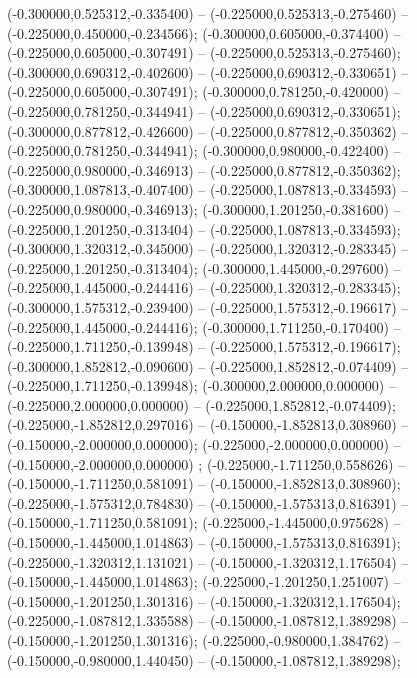  (-0.300000,0.525312,-0.335400) -- (-0.225000,0.525313,-0.275460) -- (-0.225000,0.450000,-0.234566);
 (-0.300000,0.605000,-0.374400) -- (-0.225000,0.605000,-0.307491) -- (-0.225000,0.525313,-0.275460);
 (-0.300000,0.690312,-0.402600) -- (-0.225000,0.690312,-0.330651) -- (-0.225000,0.605000,-0.307491);
 (-0.300000,0.781250,-0.420000) -- (-0.225000,0.781250,-0.344941) -- (-0.225000,0.690312,-0.330651);
 (-0.300000,0.877812,-0.426600) -- (-0.225000,0.877812,-0.350362) -- (-0.225000,0.781250,-0.344941);
 (-0.300000,0.980000,-0.422400) -- (-0.225000,0.980000,-0.346913) -- (-0.225000,0.877812,-0.350362);
 (-0.300000,1.087813,-0.407400) -- (-0.225000,1.087813,-0.334593) -- (-0.225000,0.980000,-0.346913);
 (-0.300000,1.201250,-0.381600) -- (-0.225000,1.201250,-0.313404) -- (-0.225000,1.087813,-0.334593);
 (-0.300000,1.320312,-0.345000) -- (-0.225000,1.320312,-0.283345) -- (-0.225000,1.201250,-0.313404);
 (-0.300000,1.445000,-0.297600) -- (-0.225000,1.445000,-0.244416) -- (-0.225000,1.320312,-0.283345);
 (-0.300000,1.575312,-0.239400) -- (-0.225000,1.575312,-0.196617) -- (-0.225000,1.445000,-0.244416);
 (-0.300000,1.711250,-0.170400) -- (-0.225000,1.711250,-0.139948) -- (-0.225000,1.575312,-0.196617);
 (-0.300000,1.852812,-0.090600) -- (-0.225000,1.852812,-0.074409) -- (-0.225000,1.711250,-0.139948);
 (-0.300000,2.000000,0.000000) -- (-0.225000,2.000000,0.000000) -- (-0.225000,1.852812,-0.074409);
 (-0.225000,-1.852812,0.297016) -- (-0.150000,-1.852813,0.308960) -- (-0.150000,-2.000000,0.000000);
 (-0.225000,-2.000000,0.000000) -- (-0.150000,-2.000000,0.000000) ;
 (-0.225000,-1.711250,0.558626) -- (-0.150000,-1.711250,0.581091) -- (-0.150000,-1.852813,0.308960);
 (-0.225000,-1.575312,0.784830) -- (-0.150000,-1.575313,0.816391) -- (-0.150000,-1.711250,0.581091);
 (-0.225000,-1.445000,0.975628) -- (-0.150000,-1.445000,1.014863) -- (-0.150000,-1.575313,0.816391);
 (-0.225000,-1.320312,1.131021) -- (-0.150000,-1.320312,1.176504) -- (-0.150000,-1.445000,1.014863);
 (-0.225000,-1.201250,1.251007) -- (-0.150000,-1.201250,1.301316) -- (-0.150000,-1.320312,1.176504);
 (-0.225000,-1.087812,1.335588) -- (-0.150000,-1.087812,1.389298) -- (-0.150000,-1.201250,1.301316);
 (-0.225000,-0.980000,1.384762) -- (-0.150000,-0.980000,1.440450) -- (-0.150000,-1.087812,1.389298);
